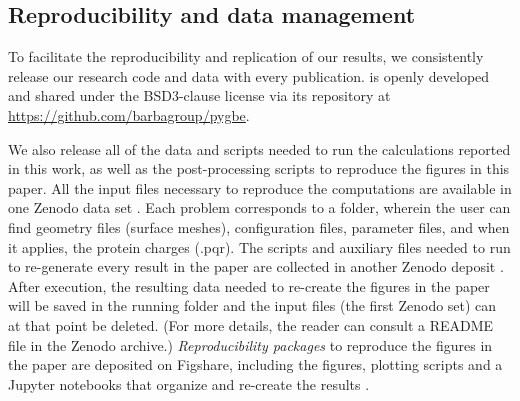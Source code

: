 \subsection{Reproducibility and data management} \label{sec:repro}

To facilitate the reproducibility and replication of our results, 
we consistently release our research code and data with every publication. \pygbe is openly developed and 
shared under the BSD3-clause license via its repository at \url{https://github.com/barbagroup/pygbe}.

We also release all of the data and scripts needed to run the calculations reported in this work, 
as well as the post-processing scripts to reproduce the figures in this paper. 
All the input files necessary to reproduce the computations are available in one Zenodo data set \cite{ClementiETal2018a}. 
Each problem corresponds to a folder, wherein the user can find geometry files (surface meshes), 
configuration files, parameter files, and when it applies, the protein charges (.pqr).
The scripts and auxiliary files needed to run \pygbe to re-generate every result in the paper are collected in another Zenodo deposit \cite{ClementiETal2018b}.
After execution, the resulting data needed to re-create the figures in the paper will be saved in the running folder and the input files (the first Zenodo set) can at that point be deleted.
(For more details, the reader can consult a README file in the Zenodo archive.)
\emph{Reproducibility packages} to reproduce the figures in the paper are deposited on Figshare, 
including the figures, plotting scripts and a Jupyter notebooks that organize and re-create the results \cite{ClementiETal2018c,ClementiETal2018d,ClementiETal2018e,ClementiETal2018f}.
